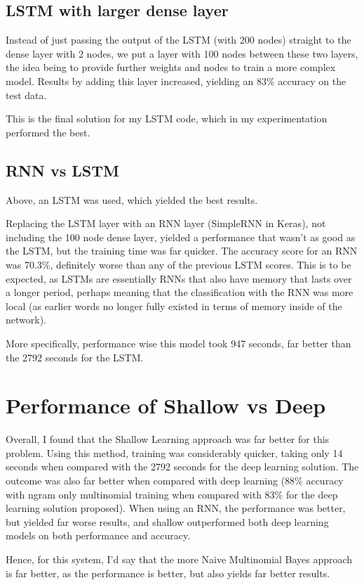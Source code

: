 \documentclass[12pt]{article}
\begin{document}
\subsection{LSTM with larger dense layer}
Instead of just passing the output of the LSTM (with 200 nodes) straight to the dense layer with 2 nodes, we put a layer with 100 nodes between these two layers,
the idea being to provide further weights and nodes to train a more complex model. Results by adding this layer increased, yielding an 83\% accuracy on the test data.

This is the final solution for my LSTM code, which in my experimentation performed the best.

\subsection{RNN vs LSTM}
Above, an LSTM was used, which yielded the best results.

Replacing the LSTM layer with an RNN layer (SimpleRNN in Keras), not including the 100 node dense layer,
yielded a performance that wasn't as good as the LSTM, but the training time was far quicker. The accuracy score for an RNN was
70.3\%, definitely worse than any of the previous LSTM scores. This is to be expected, as LSTMs are essentially RNNs that also have
memory that lasts over a longer period, perhaps meaning that the classification with the RNN was more local (as earlier words no longer fully 
existed in terms of memory inside of the network). 

More specifically, performance wise this model took 947 seconds, far better than the 2792 seconds for the LSTM.
\section{Performance of Shallow vs Deep}
Overall, I found that the Shallow Learning approach was far better for this problem. Using this method, training was considerably quicker, taking only 14 seconds when compared with the 2792 seconds for the deep learning solution.
The outcome was also far better when compared with deep learning (88\% accuracy with ngram only multinomial training when compared with 83\% for the deep learning solution proposed).
When using an RNN, the performance was better, but yielded far worse results, and shallow outperformed both deep learning models on both performance and accuracy.

Hence, for this system, I'd say that the more Naive Multinomial Bayes approach is far better, as the performance is better, but also yields far better results.
\end{document}
